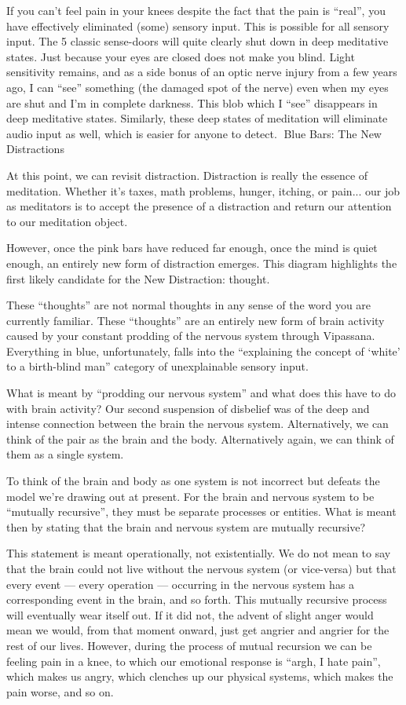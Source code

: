 \documentclass{article}
\begin{document}
If you can’t feel pain in your knees despite the fact that the pain is “real”, you have effectively eliminated (some) sensory input. This is possible for all sensory input. The 5 classic sense-doors will quite clearly shut down in deep meditative states. Just because your eyes are closed does not make you blind. Light sensitivity remains, and as a side bonus of an optic nerve injury from a few years ago, I can ``see'' something (the damaged spot of the nerve) even when my eyes are shut and I'm in complete darkness. This blob which I ``see'' disappears in deep meditative states. Similarly, these deep states of meditation will eliminate audio input as well, which is easier for anyone to detect.
Blue Bars:
The New Distractions

At this point, we can revisit distraction. Distraction is really the essence of meditation. Whether it's taxes, math problems, hunger, itching, or pain... our job as meditators is to accept the presence of a distraction and return our attention to our meditation object.

However, once the pink bars have reduced far enough, once the mind is quiet enough, an entirely new form of distraction emerges. This diagram highlights the first likely candidate for the New Distraction: thought.

These ``thoughts'' are not normal thoughts in any sense of the word you are currently familiar. These ``thoughts'' are an entirely new form of brain activity caused by your constant prodding of the nervous system through Vipassana. Everything in blue, unfortunately, falls into the “explaining the concept of ‘white’ to a birth-blind man” category of unexplainable sensory input.

What is meant by ``prodding our nervous system'' and what does this have to do with brain activity? Our second suspension of disbelief was of the deep and intense connection between the brain the nervous system. Alternatively, we can think of the pair as the brain and the body. Alternatively again, we can think of them as a single system.

To think of the brain and body as one system is not incorrect but defeats the model we're drawing out at present. For the brain and nervous system to be ``mutually recursive'', they must be separate processes or entities. What is meant then by stating that the brain and nervous system are mutually recursive?

This statement is meant operationally, not existentially. We do not mean to say that the brain could not live without the nervous system (or vice-versa) but that every event — every operation — occurring in the nervous system has a corresponding event in the brain, and so forth. This mutually recursive process will eventually wear itself out. If it did not, the advent of slight anger would mean we would, from that moment onward, just get angrier and angrier for the rest of our lives. However, during the process of mutual recursion we can be feeling pain in a knee, to which our emotional response is “argh, I hate pain”, which makes us angry, which clenches up our physical systems, which makes the pain worse, and so on.
\end{document}
